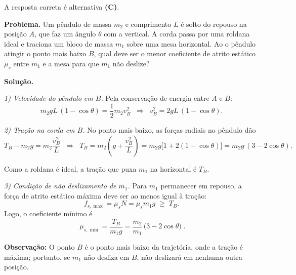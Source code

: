 \documentclass[a4paper,12pt]{article}
\newcommand{\printingbibliography}{%

    \pagestyle{myheadings}
    \markright{}
    \sloppy
    \printbibliography[heading=bibintoc, %
                   title=Refer\^encias %
                  ]
    \fussy%
}
\begin{document}
\begin{flushleft}
A resposta correta é alternativa \colorbox{green!50}{\textbf{(C)}}.

\end{flushleft}

\newpage 

\begin{flushleft}
\textbf{Problema.} Um pêndulo de massa $m_2$ e comprimento $L$ é solto do repouso na posição $A$, que faz um ângulo $\theta$ com a vertical. A corda passa por uma roldana ideal e traciona um bloco de massa $m_1$ sobre uma mesa horizontal. Ao o pêndulo atingir o ponto mais baixo $B$, qual deve ser o menor coeficiente de atrito estático $\mu_s$ entre $m_1$ e a mesa para que $m_1$ não deslize?

\vspace{0.4cm}
\textbf{Solução.}

\textit{1) Velocidade do pêndulo em $B$.} Pela conservação de energia entre $A$ e $B$:
\[
m_2 g L\,(1-\cos\theta)=\frac12 m_2 v_B^2
\;\;\Rightarrow\;\;
v_B^2=2gL\,(1-\cos\theta).
\]

\textit{2) Tração na corda em $B$.} No ponto mais baixo, as forças radiais no pêndulo dão
\[
T_B - m_2 g = m_2\frac{v_B^2}{L}
\;\;\Rightarrow\;\;
T_B = m_2\!\left(g+\frac{v_B^2}{L}\right)
     = m_2 g\bigl[1+2(1-\cos\theta)\bigr]
     = m_2 g\,(3-2\cos\theta).
\]

Como a roldana é ideal, a tração que puxa $m_1$ na horizontal é $T_B$.

\textit{3) Condição de não deslizamento de $m_1$.} Para $m_1$ permanecer em repouso,
a força de atrito estático máxima deve ser ao menos igual à tração:
\[
f_{s,\max}=\mu_s N=\mu_s m_1 g \;\ge\; T_B.
\]
Logo, o coeficiente mínimo é
\[
\boxed{\;\mu_{s,\min}=\frac{T_B}{m_1 g}
      =\frac{m_2}{m_1}\,\bigl(3-2\cos\theta\bigr)\; }.
\]

\textbf{Observação:} O ponto $B$ é o ponto mais baixo da trajetória, onde a tração é máxima; portanto, se $m_1$ não desliza em $B$, não deslizará em nenhuma outra posição.
\end{flushleft}




\end{document}
